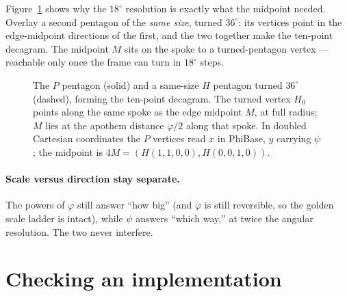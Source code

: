 \documentclass[11pt]{article}
\newcommand{\phigr}{\varphi}
\newcommand{\Hn}[4]{H(#1,#2,#3,#4)}
\begin{document}
Figure~\ref{fig:overlay} shows why the $18^\circ$ resolution is exactly what the midpoint needed. Overlay
a second pentagon of the \emph{same size}, turned $36^\circ$: its vertices point in the edge-midpoint
directions of the first, and the two together make the ten-point decagram. The midpoint $M$ sits on the
spoke to a turned-pentagon vertex --- reachable only once the frame can turn in $18^\circ$ steps.

\begin{figure}[h]
\centering
{}
\caption{The $P$ pentagon (solid) and a same-size $H$ pentagon turned $36^\circ$ (dashed), forming the
ten-point decagram. The turned vertex $H_0$ points along the same spoke as the edge midpoint $M$, at full
radius; $M$ lies at the apothem distance $\phigr/2$ along that spoke. In doubled Cartesian coordinates
the $P$ vertices read $x$ in PhiBase, $y$ carrying $\psi$; the midpoint is $4M = (\Hn{1}{1}{0}{0},
\Hn{0}{0}{1}{0})$.}
\label{fig:overlay}
\end{figure}

\paragraph{Scale versus direction stay separate.} The powers of $\phigr$ still answer ``how big''
(and $\phigr$ is still reversible, so the golden scale ladder is intact), while $\psi$ answers
``which way,'' at twice the angular resolution. The two never interfere.

\section{Checking an implementation}
\label{sec:verify}
\end{document}
